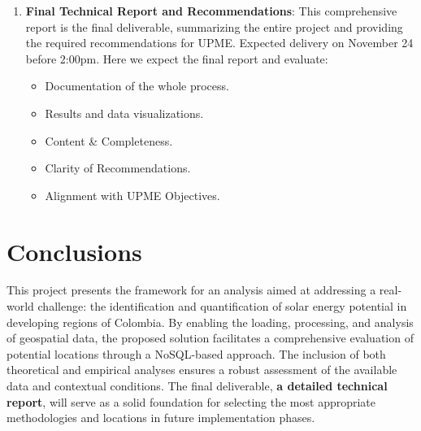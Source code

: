\documentclass[12pt]{article}
\begin{document}
\begin{enumerate}
  \item \textbf{Final Technical Report and Recommendations}: This comprehensive report is the final deliverable, summarizing the entire project and providing the required recommendations for UPME. Expected delivery on November 24 before 2:00pm. Here we expect the final report and evaluate:
    \begin{itemize}
      \item Documentation of the whole process.
      \item Results and data visualizations.
      \item Content \& Completeness.
      \item Clarity of Recommendations.
      \item Alignment with UPME Objectives.
    \end{itemize}

\end{enumerate}

\section{Conclusions}
This project presents the framework for an analysis aimed at addressing a real-world challenge: the identification and quantification of solar energy potential in developing regions of Colombia. By enabling the loading, processing, and analysis of geospatial data, the proposed solution facilitates a comprehensive evaluation of potential locations through a NoSQL-based approach. The inclusion of both theoretical and empirical analyses ensures a robust assessment of the available data and contextual conditions. The final deliverable, \textbf{a detailed technical report}, will serve as a solid foundation for selecting the most appropriate methodologies and locations in future implementation phases.
\end{document}
